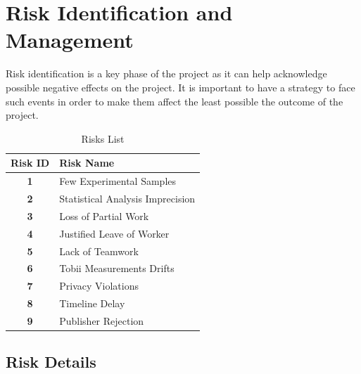 \section{Risk Identification and Management}
Risk identification is a key phase of the project as it can help acknowledge possible negative 
effects on the project. It is important to have a strategy to face such events in order to make 
them affect the least possible the outcome of the project.
\begin{table} [H]
    \centering
    \caption{Risks List}
    \label{tab:risks}
    \begin{tabularx}{0.8\textwidth} { 
        | >{\raggedright\arraybackslash}c 
        | >{\centering\arraybackslash}X| }
        \hline \textbf{Risk ID} & \textbf{Risk Name} \\
        \hline
        \textbf{1} & Few Experimental Samples \\
        \hline
        \textbf{2} & Statistical Analysis Imprecision \\
        \hline
        \textbf{3} & Loss of Partial Work \\
        \hline
        \textbf{4} & Justified Leave of Worker \\
        \hline
        \textbf{5} & Lack of Teamwork \\
        \hline
        \textbf{6} & Tobii Measurements Drifts \\
        \hline
        \textbf{7} & Privacy Violations \\
        \hline
        \textbf{8} & Timeline Delay \\
        \hline
        \textbf{9} & Publisher Rejection \\
        \hline
    \end{tabularx}
\end{table}
\subsection{Risk Details}
\label{sub:risk_details}
